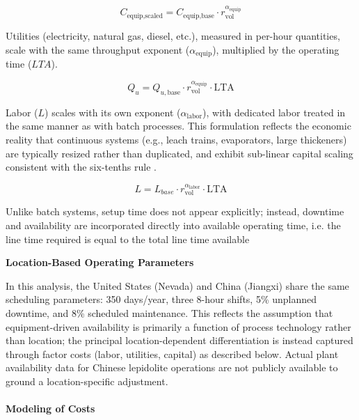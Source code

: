 \documentclass{article}
\renewcommand\_{\textunderscore\allowbreak}
\newcommand{\alteq}[1]{}
\newcommand{\alteqend}{}
\begin{document}
\alteq{Scaled equipment cost equals base equipment cost multiplied by the volume ratio raised to the equipment scaling exponent alpha-equip.}
\begin{equation}
    C_{\text{equip,scaled}} = C_{\text{equip,base}} \cdot r_{\text{vol}} ^ {\alpha_{\text{equip}}}
\end{equation}
\alteqend

Utilities (electricity, natural gas, diesel, etc.), measured in per-hour quantities, scale with the same throughput exponent ($\alpha_{\text{equip}}$), multiplied by the operating time ($LTA$).

\begin{equation}
    Q_u = Q_{u,\text{base}} \cdot r_{\text{vol}} ^ {\alpha_{\text{equip}}} \cdot \text{LTA}
\end{equation}

Labor ($L$) scales with its own exponent ($\alpha_{\text{labor}}$), with dedicated labor treated in the same manner as with batch processes. This formulation reflects the economic reality that continuous systems (e.g., leach trains, evaporators, large thickeners) are typically resized rather than duplicated, and exhibit sub-linear capital scaling consistent with the six-tenths rule \citep{petersPlantDesignEconomics1991}. 

\begin{equation}
    L = L_{base} \cdot r_{\text{vol}} ^ {\alpha_{\text{labor}}} \cdot \text{LTA}
\end{equation}

Unlike batch systems, setup time does not appear explicitly; instead, downtime and availability are incorporated directly into available operating time, i.e. the line time required is equal to the total line time available

\medskip
\noindent\textbf{Location-Based Operating Parameters}\quad

In this analysis, the United States (Nevada) and China (Jiangxi) share the same scheduling parameters: 350 days/year, three 8-hour shifts, 5\% unplanned downtime, and 8\% scheduled maintenance. This reflects the assumption that equipment-driven availability is primarily a function of process technology rather than location; the principal location-dependent differentiation is instead captured through factor costs (labor, utilities, capital) as described below. Actual plant availability data for Chinese lepidolite operations are not publicly available to ground a location-specific adjustment.

\paragraph{Modeling of Costs}\label{app:04-methods-system-costs}\leavevmode\par
\end{document}
